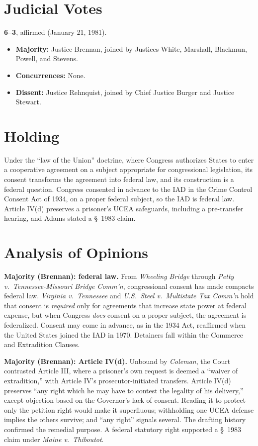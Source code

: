 \documentclass[12pt]{article}
\begin{document}
\section{Judicial Votes}

\textbf{6--3}, affirmed (January 21, 1981).
\begin{itemize}
\item \textbf{Majority:} Justice Brennan, joined by Justices White, Marshall, Blackmun, Powell, and Stevens.
\item \textbf{Concurrences:} None.
\item \textbf{Dissent:} Justice Rehnquist, joined by Chief Justice Burger and Justice Stewart.
\end{itemize}

\section{Holding}

Under the ``law of the Union'' doctrine, where Congress authorizes States to enter a cooperative agreement on a subject appropriate for congressional legislation, its consent transforms the agreement into federal law, and its construction is a federal question. Congress consented in advance to the IAD in the Crime Control Consent Act of 1934, on a proper federal subject, so the IAD is federal law. Article IV(d) preserves a prisoner's UCEA safeguards, including a pre-transfer hearing, and Adams stated a \S~1983 claim.

\section{Analysis of Opinions}

\textbf{Majority (Brennan): federal law.} From \textit{Wheeling Bridge} through \textit{Petty v.\ Tennessee-Missouri Bridge Comm'n}, congressional consent has made compacts federal law. \textit{Virginia v.\ Tennessee} and \textit{U.S.\ Steel v.\ Multistate Tax Comm'n} hold that consent is \textit{required} only for agreements that increase state power at federal expense, but when Congress \textit{does} consent on a proper subject, the agreement is federalized. Consent may come in advance, as in the 1934 Act, reaffirmed when the United States joined the IAD in 1970. Detainers fall within the Commerce and Extradition Clauses.

\textbf{Majority (Brennan): Article IV(d).} Unbound by \textit{Coleman}, the Court contrasted Article III, where a prisoner's own request is deemed a ``waiver of extradition,'' with Article IV's prosecutor-initiated transfers. Article IV(d) preserves ``any right which he may have to contest the legality of his delivery,'' except objection based on the Governor's lack of consent. Reading it to protect only the petition right would make it superfluous; withholding one UCEA defense implies the others survive; and ``any right'' signals several. The drafting history confirmed the remedial purpose. A federal statutory right supported a \S~1983 claim under \textit{Maine v.\ Thiboutot}.
\end{document}
